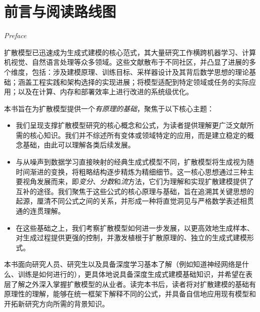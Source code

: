 \chapter*{前言与阅读路线图}
{\sffamily\slshape Preface}


扩散模型已迅速成为生成式建模的核心范式，其大量研究工作横跨机器学习、计算机视觉、自然语言处理等众多领域。这些文献散布于不同社区，并凸显了进展的多个维度，包括：涉及建模原理、训练目标、采样器设计及其背后数学思想的理论基础；涵盖工程实践和架构选择的实现进展；将模型适配到特定领域或任务的实际应用；以及在计算、内存和部署效率上进行改进的系统级优化。


本书旨在为扩散模型提供一个\emph{有原理的基础}，聚焦于以下核心主题：
\begin{itemize}
    \item 我们呈现支撑扩散模型研究的核心概念和公式，为读者提供理解更广泛文献所需的核心知识。我们并不综述所有变体或领域特定的应用，而是建立稳定的概念基础，由此可以理解各类后续发展。
    \item 与从噪声到数据学习直接映射的经典生成式模型不同，扩散模型将生成视为随时间渐进的变换，将粗略结构逐步精炼为精细细节。这一核心思想通过三种主要视角发展而来，即\emph{变分}、\emph{分数}和\emph{流}方法，它们为理解和实现扩散建模提供了互补的途径。我们聚焦于这些公式的核心原理与基础，旨在追溯其关键思想的起源，厘清不同公式之间的关系，并形成一种将直觉洞见与严格数学表述相贯通的连贯理解。
    \item 在这些基础之上，我们考察扩散模型如何进一步发展，以更高效地生成样本、对生成过程提供更强的控制，并激发植根于扩散原理的、独立的生成式建模形式。
\end{itemize}


本书面向研究人员、研究生以及具备深度学习基本了解（例如知道神经网络是什么、训练是如何进行的），更具体地说具备深度生成式建模基础知识，并希望在表层了解之外深入掌握扩散模型的从业者。读完本书后，读者将对扩散建模的基础有原理性的理解，能够在统一框架下解释不同的公式，并具备自信地应用现有模型和开拓新研究方向所需的背景知识。


